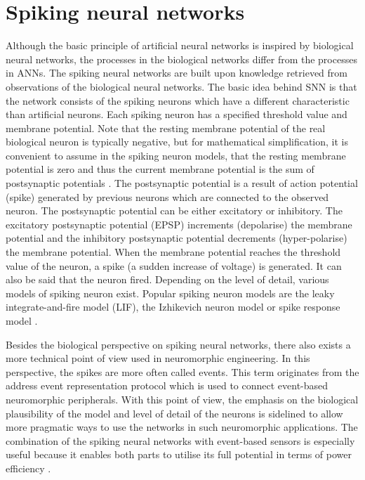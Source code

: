 \section{Spiking neural networks}
Although the basic principle of artificial neural networks is inspired by biological neural networks, the processes in the biological networks differ from the processes in ANNs. The spiking neural networks are built upon knowledge retrieved from observations of the biological neural networks. The basic idea behind SNN is that the network consists of the spiking neurons which have a different characteristic than artificial neurons. Each spiking neuron has a specified threshold value and membrane potential. Note that the resting membrane potential of the real biological neuron is typically negative, but for mathematical simplification, it is convenient to assume in the spiking neuron models, that the resting membrane potential is zero and thus the current membrane potential is the sum of postsynaptic potentials \cite{maassNetworksSpikingNeurons1997}. The postsynaptic potential is a result of action potential (spike) generated by previous neurons which are connected to the observed neuron. The postsynaptic potential can be either excitatory or inhibitory. The excitatory postsynaptic potential (EPSP) increments (depolarise) the membrane potential and the inhibitory postsynaptic potential decrements (hyper-polarise) the membrane potential. When the membrane potential reaches the threshold value of the neuron, a spike (a sudden increase of voltage) is generated. It can also be said that the neuron fired. Depending on the level of detail, various models of spiking neuron exist. Popular spiking neuron models are the leaky integrate-and-fire model (LIF), the Izhikevich neuron model or spike response model \cite{tavanaeiDeepLearningSpiking2019}. \par
Besides the biological perspective on spiking neural networks, there also exists a more technical point of view used in neuromorphic engineering. In this perspective, the spikes are more often called events. This term originates from the address event representation protocol \cite{pazTestInfrastructureAddressEventRepresentation2005, boahenPointtopointConnectivity00} which is used to connect event-based neuromorphic peripherals. With this point of view, the emphasis on the biological plausibility of the model and level of detail of the neurons is sidelined to allow more pragmatic ways to use the networks in such neuromorphic applications. The combination of the spiking neural networks with event-based sensors is especially useful because it enables both parts to utilise its full potential in terms of power efficiency \cite{pfeifferDeepLearningSpiking2018}.

